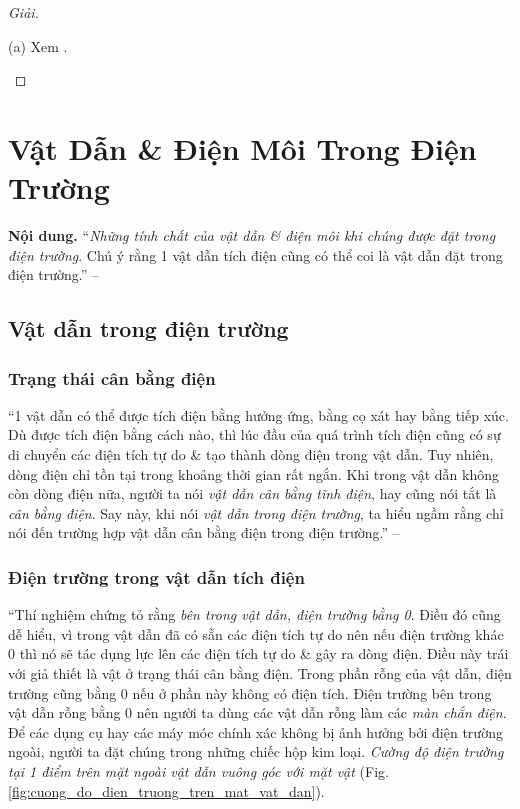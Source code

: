 \documentclass[oneside]{book}
\numberwithin{equation}{section}
\begin{document}
\begin{proof}[Giải]
	\begin{enumerate*}
		\item[(a)] Xem \cite[p. 27]{SGK_Vat_Ly_11_nang_cao}.
	\end{enumerate*}
\end{proof}


\section{Vật Dẫn \& Điện Môi Trong Điện Trường}
\textbf{Nội dung.} ``\textit{Những tính chất của vật dẫn \& điện môi khi chúng được đặt trong điện trường}. Chú ý rằng 1 vật dẫn tích điện cũng có thể coi là vật dẫn đặt trong điện trường.'' -- \cite[p. 28]{SGK_Vat_Ly_11_nang_cao}

\subsection{Vật dẫn trong điện trường}

\subsubsection{Trạng thái cân bằng điện}
``1 vật dẫn có thể được tích điện bằng hưởng ứng, bằng cọ xát hay bằng tiếp xúc. Dù được tích điện bằng cách nào, thì lúc đầu của quá trình tích điện cũng có sự di chuyển các điện  tích tự do \& tạo thành dòng điện trong vật dẫn. Tuy nhiên, dòng điện chỉ tồn tại trong khoảng thời gian rất ngắn. Khi trong vật dẫn không còn dòng điện nữa, người ta nói \textit{vật dẫn cân bằng tĩnh điện}, hay cũng nói tắt là \textit{cân bằng điện}. Say này, khi nói \textit{vật dẫn trong điện trường}, ta hiểu ngầm rằng chỉ nói đến trường hợp vật dẫn cân bằng điện trong điện trường.'' -- \cite[p. 28]{SGK_Vat_Ly_11_nang_cao}

\subsubsection{Điện trường trong vật dẫn tích điện}
``Thí nghiệm chứng tỏ rằng \textit{bên trong vật dẫn, điện trường bằng 0}. Điều đó cũng dễ hiểu, vì trong vật dẫn đã có sẵn các điện tích tự do nên nếu điện trường khác 0 thì nó sẽ tác dụng lực lên các điện tích tự do \& gây ra dòng điện. Điều này trái với giả thiết là vật ở trạng thái cân bằng điện. Trong phần rỗng của vật dẫn, điện trường cũng bằng 0 nếu ở phần này không có điện tích. Điện trường bên trong vật dẫn rỗng bằng 0 nên người ta dùng các vật dẫn rỗng làm các \textit{màn chắn điện}. Để các dụng cụ hay các máy móc chính xác không bị ảnh hưởng bởi điện trường ngoài, người ta đặt chúng trong những chiếc hộp kim loại. \textit{Cường độ điện trường tại 1 điểm trên mặt ngoài vật dẫn vuông góc với mặt vật} (Fig. \ref{fig:cuong_do_dien_truong_tren_mat_vat_dan}).
\end{document}
